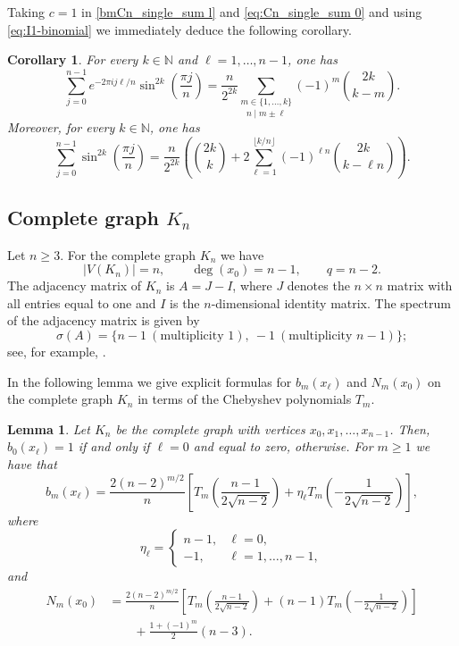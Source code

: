 \documentclass[reqno,10pt]{amsart}
\newtheorem{lemma}[theorem]{Lemma}
\newtheorem{corollary}[theorem]{Corollary}
\theoremstyle{definition}
\numberwithin{equation}{section}
\begin{document}
Taking $c=1$ in \eqref{bmCn_single_sum l} and \eqref{eq:Cn_single_sum 0} and using \eqref{eq:I1-binomial} we immediately deduce the following corollary.

\begin{corollary}
For every $k\in\mathbb N$ and $\ell=1,\ldots,n-1$, one has
\[
\sum_{j=0}^{n-1}
e^{-2\pi i j\ell/n}
\sin^{2k}\!\left(\frac{\pi j}{n}\right)
=
\frac{n}{2^{2k}} \underset{n\mid m\pm \ell}{\sum_{m\in\{1,\ldots,k\}}}(-1)^m
\binom{2k}{k-m}.
\]
Moreover, for every $k\in\mathbb N$, one has
\[
\sum_{j=0}^{n-1}\sin^{2k}\!\left(\frac{\pi j}{n}\right)
=
\frac{n}{2^{2k}} 
\left(
\binom{2k}{k}
+
2\sum_{\ell=1}^{\lfloor k/n\rfloor}
(-1)^{\ell n}\binom{2k}{k-\ell n}
\right).
\]
\end{corollary}

\subsection{Complete graph $K_n$}

Let $n\ge 3$. For the complete graph $K_n$ we have
\[
|V(K_n)|=n,
\qquad
\deg(x_0)=n-1,
\qquad
q=n-2.
\]
The adjacency matrix of $K_n$ is $A=J-I$, where $J$ denotes the $n\times n$ matrix with all entries equal to one and $I$ is the $n$-dimensional identity matrix. The spectrum of the adjacency matrix is given by
\[
\sigma(A)=\{n-1\ (\text{multiplicity }1),\ -1\ (\text{multiplicity }n-1)\};
\]
see, for example, \cite[Chapter~1]{Ch97}. 

In the following lemma we give explicit formulas for $b_m(x_\ell)$ and
$N_m(x_0)$ on the complete graph $K_n$ in terms of the Chebyshev polynomials $T_m$.
\begin{lemma}\label{cor:Kn_bm_Nm}
Let $K_n$ be the complete graph with vertices
$x_0,x_1,\ldots,x_{n-1}$. Then, $b_0(x_\ell)=1$ if and only if $\ell=0$ and equal to zero, otherwise. For $m\ge1$ we have that
\begin{equation}\label{eq. bm complete graph}
b_m(x_\ell)
=
\frac{2(n-2)^{m/2}}{n}
\left[
T_m\!\left(\frac{n-1}{2\sqrt{n-2}}\right)
+
\eta_\ell
T_m\!\left(-\frac{1}{2\sqrt{n-2}}\right)
\right],
\end{equation}
where
\[
\eta_\ell=
\begin{cases}
n-1, & \ell=0,\\
-1, & \ell=1,\ldots,n-1,
\end{cases}
\]
and
\begin{equation}\label{eq. n0 complete graph}
\begin{split}
N_m(x_0)
&=
\frac{2(n-2)^{m/2}}{n}
\left[
T_m\!\left(\frac{n-1}{2\sqrt{n-2}}\right)
+
(n-1)T_m\!\left(-\frac{1}{2\sqrt{n-2}}\right)
\right]  \\
&\qquad
+
\frac{1+(-1)^m}{2}(n-3).
\end{split}
\end{equation}
\end{lemma}
\end{document}
